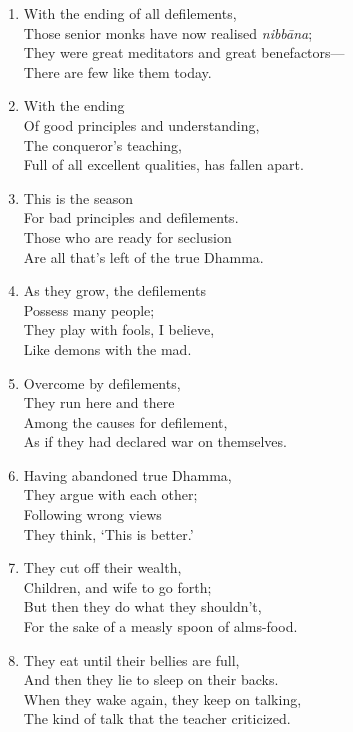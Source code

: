 \documentclass[10pt, openany]{book}
\begin{document}
\begin{enumerate}
\item With the ending of all defilements,\\
Those senior monks have now realised \emph{nibbāna};\\
They were great meditators and great benefactors—\\
There are few like them today.

\item With the ending\\
Of good principles and understanding,\\
The conqueror’s teaching,\\
Full of all excellent qualities, has fallen apart.

\item This is the season\\
For bad principles and defilements.\\
Those who are ready for seclusion\\
Are all that’s left of the true Dhamma.

\item As they grow, the defilements\\
Possess many people;\\
They play with fools, I believe,\\
Like demons with the mad.

\item Overcome by defilements,\\
They run here and there\\
Among the causes for defilement,\\
As if they had declared war on themselves.

\item Having abandoned true Dhamma,\\
They argue with each other;\\
Following wrong views\\
They think, ‘This is better.’

\item They cut off their wealth,\\
Children, and wife to go forth;\\
But then they do what they shouldn’t,\\
For the sake of a measly spoon of alms-food.

\item They eat until their bellies are full,\\
And then they lie to sleep on their backs.\\
When they wake again, they keep on talking,\\
The kind of talk that the teacher criticized.


\end{enumerate}
\end{document}
